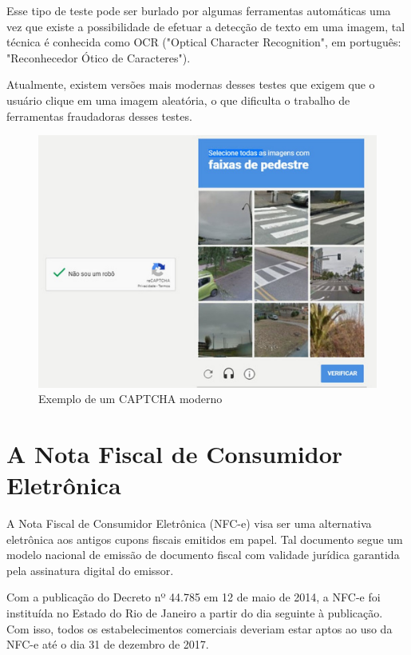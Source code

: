 Esse tipo de teste pode ser burlado por algumas ferramentas automáticas uma vez que existe a possibilidade de efetuar a detecção de texto em uma imagem, tal técnica é conhecida como OCR ("Optical Character Recognition", em português: "Reconhecedor Ótico de Caracteres").\cite{captchaExame}

Atualmente, existem versões mais modernas desses testes que exigem que o usuário clique em uma imagem aleatória, o que dificulta o trabalho de ferramentas fraudadoras desses testes.\cite{captchaExame}

\begin{figure}[h]
    \centering
    \includegraphics[scale=0.15]{tcc/figures/captcha/recaptcha-post-g1.jpg}
    \caption{Exemplo de um CAPTCHA moderno}
    \label{fig-exemplo-captcha-alfanumerico}
\end{figure}

\section{A Nota Fiscal de Consumidor Eletrônica}\label{secNfce}

A Nota Fiscal de Consumidor Eletrônica (NFC-e) visa ser uma alternativa eletrônica aos antigos cupons fiscais emitidos em papel. Tal documento segue um modelo nacional de emissão de documento fiscal com validade jurídica garantida pela assinatura digital do emissor.

Com a publicação do Decreto nº 44.785 em 12 de maio de 2014, a NFC-e foi instituída no Estado do Rio de Janeiro a partir do dia seguinte à publicação. Com isso, todos os estabelecimentos comerciais deveriam estar aptos ao uso da NFC-e até o dia 31 de dezembro de 2017.\cite{nfceDefinicao}

